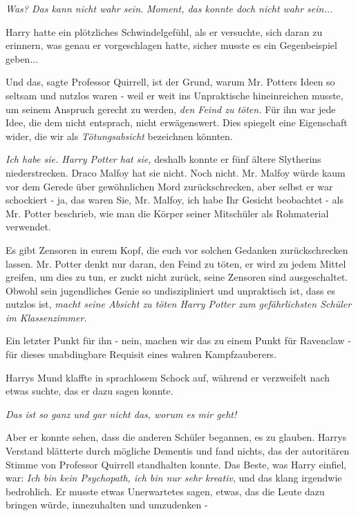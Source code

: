 \emph{Was? Das kann nicht wahr sein.} \emph{Moment, das konnte doch nicht wahr
sein...}

Harry hatte ein plötzliches Schwindelgefühl, als er versuchte, sich daran zu
erinnern, was genau er vorgeschlagen hatte, sicher musste es ein Gegenbeispiel
geben...

\glqq{}Und das\grqq{}, sagte Professor Quirrell, \glqq{}ist der Grund, warum Mr.
Potters Ideen so seltsam und nutzlos waren - weil er weit ins Unpraktische
hineinreichen musste, um seinem Anspruch gerecht zu werden, \emph{den Feind zu
töten.} Für ihn war jede Idee, die dem nicht entsprach, nicht erwägenswert. Dies
spiegelt eine Eigenschaft wider, die wir als \emph{Tötungsabsicht} bezeichnen
könnten.

\emph{Ich habe sie. Harry Potter hat sie,} deshalb konnte er fünf ältere
Slytherins niederstrecken. Draco Malfoy hat sie nicht. Noch nicht. Mr. Malfoy
würde kaum vor dem Gerede über gewöhnlichen Mord zurückschrecken, aber selbst er
war schockiert - ja, das waren Sie, Mr. Malfoy, ich habe Ihr Gesicht beobachtet
- als Mr. Potter beschrieb, wie man die Körper seiner Mitschüler als Rohmaterial
verwendet.

Es gibt Zensoren in eurem Kopf, die euch vor solchen Gedanken zurückschrecken
lassen. Mr. Potter denkt nur daran, den Feind zu töten, er wird zu jedem Mittel
greifen, um dies zu tun, er zuckt nicht zurück, seine Zensoren sind
ausgeschaltet. Obwohl sein jugendliches Genie so undiszipliniert und unpraktisch
ist, dass es nutzlos ist, \emph{macht seine Absicht zu töten Harry Potter zum
gefährlichsten Schüler im Klassenzimmer.}

Ein letzter Punkt für ihn - nein, machen wir das zu einem Punkt für Ravenclaw -
für dieses unabdingbare Requisit eines wahren Kampfzauberers.\grqq{}

Harrys Mund klaffte in sprachlosem Schock auf, während er verzweifelt nach etwas
suchte, das er dazu sagen konnte.

\emph{Das ist so ganz und gar nicht das, worum es mir geht!}

Aber er konnte sehen, dass die anderen Schüler begannen, es zu glauben. Harrys
Verstand blätterte durch mögliche Dementis und fand nichts, das der autoritären
Stimme von Professor Quirrell standhalten konnte. Das Beste, was Harry einfiel,
war: \emph{\glqq{}Ich bin kein Psychopath, ich bin nur sehr kreativ\grqq{}}, und
das klang irgendwie bedrohlich. Er musste etwas Unerwartetes sagen, etwas, das
die Leute dazu bringen würde, innezuhalten und umzudenken -

